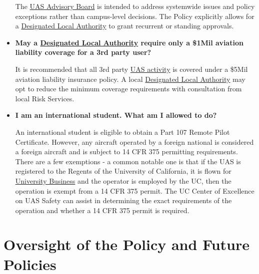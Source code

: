 \documentclass[
]{book}
\begin{document}
\begin{itemize}
  The \protect\hyperlink{AB}{UAS Advisory Board} is intended to address systemwide issues and policy exceptions rather than campus-level decisions. The Policy explicitly allows for a \protect\hyperlink{DLA}{Designated Local Authority} to grant recurrent or standing approvals.
\item
  \textbf{May a \protect\hyperlink{DLA}{Designated Local Authority} require only a \$1Mil aviation liability coverage for a 3rd party user?}

  It is recommended that all 3rd party \protect\hyperlink{UASactivity}{UAS activity} is covered under a \$5Mil aviation liability insurance policy. A local \protect\hyperlink{DLA}{Designated Local Authority} may opt to reduce the minimum coverage requirements with consultation from local Risk Services.
\item
  \textbf{I am an international student. What am I allowed to do?}

  An international student is eligible to obtain a Part 107 Remote Pilot Certificate. However, any aircraft operated by a foreign national is considered a foreign aircraft and is subject to 14 CFR 375 permitting requirements. There are a few exemptions - a common notable one is that if the UAS is registered to the Regents of the University of California, it is flown for \protect\hyperlink{UB}{University Business} and the operator is employed by the UC, then the operation is exempt from a 14 CFR 375 permit. The UC Center of Excellence on UAS Safety can assist in determining the exact requirements of the operation and whether a 14 CFR 375 permit is required.
\end{itemize}

\hypertarget{oversight-of-the-policy-and-future-policies}{%
\section{Oversight of the Policy and Future Policies}\label{oversight-of-the-policy-and-future-policies}}
\end{document}

